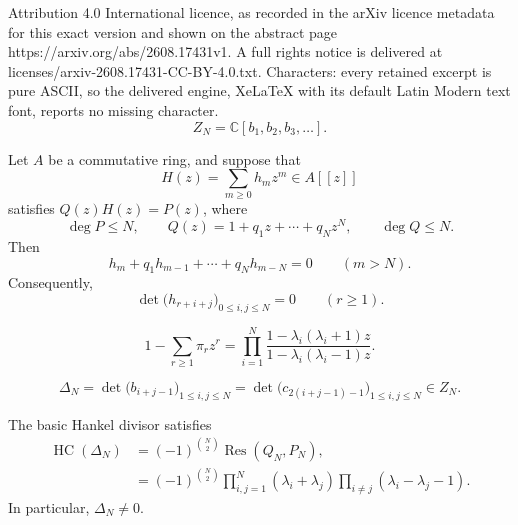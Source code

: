 \documentclass[10pt,a4paper]{amsart}
\newcommand{\C}{\mathbb C}
\newcommand{\HC}{\operatorname{HC}}
\begin{document}
Attribution 4.0 International licence, as recorded in the arXiv licence metadata for this exact version and shown on the abstract page https://arxiv.org/abs/2608.17431v1. A full rights notice is delivered at licenses/arxiv-2608.17431-CC-BY-4.0.txt. Characters: every retained excerpt is pure ASCII, so the delivered engine, XeLaTeX with its default Latin Modern text font, reports no missing character.
\begin{equation}
 Z_N=\C[b_1,b_2,b_3,\ldots].
 \label{eq:center-generated-by-b}
\end{equation}

\begin{lemma}
\label{lem:rational-hankel}
Let \(A\) be a commutative ring, and suppose that
\[
 H(z)=\sum_{m\geq0}h_mz^m\in A[[z]]
\]
satisfies \(Q(z)H(z)=P(z)\), where
\[
 \deg P\leq N,
 \qquad
 Q(z)=1+q_1z+\cdots+q_Nz^N,
 \qquad
 \deg Q\leq N.
\]
Then
\begin{equation}
 h_m+q_1h_{m-1}+\cdots+q_Nh_{m-N}=0
 \qquad(m>N).
 \label{eq:rational-linear-recurrence}
\end{equation}
Consequently,
\begin{equation}
 \det\bigl(h_{r+i+j}\bigr)_{0\leq i,j\leq N}=0
 \qquad(r\geq1).
 \label{eq:abstract-hankel-vanishing}
\end{equation}
\end{lemma}

\begin{equation}
 1-\sum_{r\geq1}\pi_rz^r
 =\prod_{i=1}^{N}
 \frac{1-\lambda_i(\lambda_i+1)z}
      {1-\lambda_i(\lambda_i-1)z}.
 \label{eq:hankel-PP-product}
\end{equation}

\begin{equation}
 \Delta_N
 =\det\bigl(b_{i+j-1}\bigr)_{1\leq i,j\leq N}
 =\det\bigl(c_{2(i+j-1)-1}\bigr)_{1\leq i,j\leq N}
 \in Z_N.
 \label{eq:Hankel-Delta}
\end{equation}

\begin{theorem}
\label{thm:Delta-resultant-factorization}
The basic Hankel divisor satisfies
\begin{align}
 \HC(\Delta_N)
 &=
 (-1)^{\binom N2}
 \operatorname{Res}(Q_N,P_N),
 \label{eq:Delta-is-resultant}\\
 &=
 (-1)^{\binom N2}
 \prod_{i,j=1}^N(\lambda_i+\lambda_j)
 \prod_{i\neq j}(\lambda_i-\lambda_j-1).
 \label{eq:Delta-product}
\end{align}
In particular, \(\Delta_N\neq0\).
\end{theorem}
\end{document}
